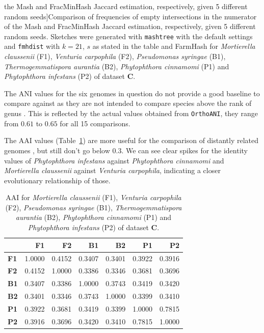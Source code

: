 \begin{table}[]
  the Mash and FracMinHash Jaccard estimation, respectively, given 5 different
  random seeds]{Comparison of frequencies of empty intersections in the
  numerator of the Mash and FracMinHash Jaccard estimation, respectively, given
  5 different random seeds. Sketches were generated with \texttt{mashtree} with
  the default settings and \texttt{fmhdist} with $k=21$, $s$ as stated in the
  table and FarmHash for \textit{Mortierella claussenii} (F1), \textit{Venturia
  carpophila} (F2), \textit{Pseudomonas syringae} (B1),
  \textit{Thermogemmatispora aurantia} (B2), \textit{Phytophthora cinnamomi}
  (P1) and \textit{Phytophthora infestans} (P2) of dataset \textbf{C}.}
  \label{ta:avodadoIntersections}
\end{table}

The ANI values for the six genomes in question do not provide a good baseline to
compare against as they are not intended to compare species above the rank of
genus \cite{leeOrthoANIImprovedAlgorithm2016}. This is reflected by the actual
values obtained from \texttt{OrthoANI}, they range from $0.61$ to $0.65$ for all
15 comparisons.

The AAI values (Table~\ref{ta:avodadoAAI}) are more useful for the comparison of
distantly related genomes \cite{rodriguez-rEnveomicsCollectionToolbox2016}, but
still don't go below $0.3$. We can see clear spikes for the identity values of
\textit{Phytophthora infestans} against \textit{Phytophthora cinnamomi} and
\textit{Mortierella claussenii} against \textit{Venturia carpophila}, indicating
a closer evolutionary relationship of those.

\begin{table}[]
  \centering
  \begin{tabular}{@{}lrrrrrr@{}}
  \toprule
              & \textbf{F1} & \textbf{F2} & \textbf{B1} & \textbf{B2} & \textbf{P1} & \textbf{P2} \\ \midrule
  \textbf{F1} & 1.0000      & 0.4152      & 0.3407      & 0.3401      & 0.3922      & 0.3916      \\
  \textbf{F2} & 0.4152      & 1.0000      & 0.3386      & 0.3346      & 0.3681      & 0.3696      \\
  \textbf{B1} & 0.3407      & 0.3386      & 1.0000      & 0.3743      & 0.3419      & 0.3420      \\
  \textbf{B2} & 0.3401      & 0.3346      & 0.3743      & 1.0000      & 0.3399      & 0.3410      \\
  \textbf{P1} & 0.3922      & 0.3681      & 0.3419      & 0.3399      & 1.0000      & 0.7815      \\
  \textbf{P2} & 0.3916      & 0.3696      & 0.3420      & 0.3410      & 0.7815      & 1.0000      \\ \bottomrule
  \end{tabular}
  \caption[AAI values for selected species of dataset \textbf{C}]{AAI for \textit{Mortierella claussenii} (F1), \textit{Venturia
  carpophila} (F2), \textit{Pseudomonas syringae} (B1),
  \textit{Thermogemmatispora aurantia} (B2), \textit{Phytophthora cinnamomi}
  (P1) and \textit{Phytophthora infestans} (P2) of dataset \textbf{C}.}
  \label{ta:avodadoAAI}
\end{table}

